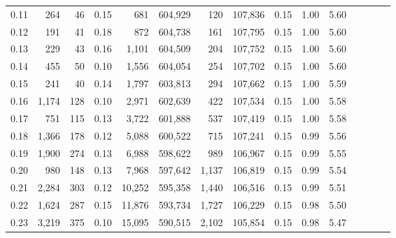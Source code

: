 \begin{tabular}{rrrcrrrrrrrrrrr}
0.11 &      264 &      46 &                                       0.15 &      681 &  604,929 &      120 &  107,836 &  0.15 &  1.00 &                         5.60 \\
0.12 &      191 &      41 &                                       0.18 &      872 &  604,738 &      161 &  107,795 &  0.15 &  1.00 &                         5.60 \\
0.13 &      229 &      43 &                                       0.16 &    1,101 &  604,509 &      204 &  107,752 &  0.15 &  1.00 &                         5.60 \\
0.14 &      455 &      50 &                                       0.10 &    1,556 &  604,054 &      254 &  107,702 &  0.15 &  1.00 &                         5.60 \\
0.15 &      241 &      40 &                                       0.14 &    1,797 &  603,813 &      294 &  107,662 &  0.15 &  1.00 &                         5.59 \\
0.16 &    1,174 &     128 &                                       0.10 &    2,971 &  602,639 &      422 &  107,534 &  0.15 &  1.00 &                         5.58 \\
0.17 &      751 &     115 &                                       0.13 &    3,722 &  601,888 &      537 &  107,419 &  0.15 &  1.00 &                         5.58 \\
0.18 &    1,366 &     178 &                                       0.12 &    5,088 &  600,522 &      715 &  107,241 &  0.15 &  0.99 &                         5.56 \\
0.19 &    1,900 &     274 &                                       0.13 &    6,988 &  598,622 &      989 &  106,967 &  0.15 &  0.99 &                         5.55 \\
0.20 &      980 &     148 &                                       0.13 &    7,968 &  597,642 &    1,137 &  106,819 &  0.15 &  0.99 &                         5.54 \\
0.21 &    2,284 &     303 &                                       0.12 &   10,252 &  595,358 &    1,440 &  106,516 &  0.15 &  0.99 &                         5.51 \\
0.22 &    1,624 &     287 &                                       0.15 &   11,876 &  593,734 &    1,727 &  106,229 &  0.15 &  0.98 &                         5.50 \\
0.23 &    3,219 &     375 &                                       0.10 &   15,095 &  590,515 &    2,102 &  105,854 &  0.15 &  0.98 &                         5.47 \\

\end{tabular}
